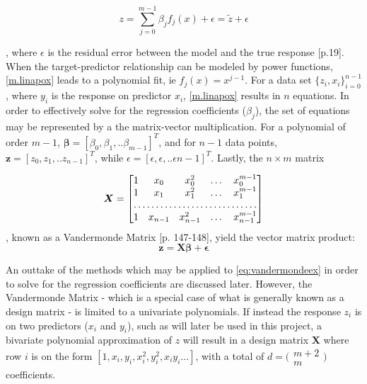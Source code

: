 \documentclass[%
oneside,                 %
final,                   %
10pt]{article}
\begin{document}
\begin{equation}
\displaystyle z=\sum_{j=0}^{m-1} \beta_j f_j(x)+\epsilon = \tilde{z}+\epsilon  
\label{m.linapox}
\end{equation}

, where $\epsilon$ is the residual error between the model and the true response \cite{MurphyKevin}[p.19]. When the target-predictor relationship can be modeled by power functions, \eqref{m.linapox} leads to a polynomial fit, ie $f_j(x)=x^{j-1}$. For a data set $\{z_i,x_i\} _{i=0}^{n-1}$, where $y_i$ is the response on predictor $x_i$, \eqref{m.linapox} results in $n$ equations. In order to effectively solve for the regression coefficients ($\beta_j$), the set of equations may be represented by a the matrix-vector multiplication. For a polynomial of order $m-1$, $\bm{\beta}=[\beta_0,\beta_1,..\beta_{m-1}]^T$, and for $n-1$ data points,  $\bm{z}=[z_0,z_1,..z_{n-1}]^T$, while $ \epsilon= [\epsilon,\epsilon,..\epsilon{n-1}]^T$. Lastly, the $n \times m $ matrix

\begin{equation}
\bm{X}=\begin{bmatrix}
    1       & x_0 & x_0^2 & \dots & x_0^{m-1} \\
    1       & x_1 & x_1^2 & \dots & x_1^{m-1} \\
    \hdotsfor{5} \\
    1       & x_{n-1} & x_{n-1}^2 & \dots & x_{n-1}^{m-1}
\end{bmatrix}
\end{equation}
, known as a Vandermonde Matrix \citep{Ascher}[p. 147-148], yield the vector matrix product:
\begin{equation}
\bm{z}=\bm{X}\bm{\beta}+\bm{\epsilon}
\label{eq:vandermondeex}
\end{equation}

An outtake of the methods which may be applied to \eqref{eq:vandermondeex} in order to solve for the regression coefficients are discussed later. However, the Vandermonde Matrix - which is a special case of what is generally known as a design matrix - is limited to a univariate polynomials. If instead the response $z_i$ is on two predictors ($x_i$ and $y_i$), such as will later be used in this project, a bivariate polynomial approximation of $z$  will result in a design matrix $\bm{X}$ where row $i$ is on the form $ [1,      x_i , y_i , x_i^2 , y_i^2 ,x_iy_i... ]$, with a total of $d=\bigl(\begin{smallmatrix}
  m+2 \\
  m
\end{smallmatrix}\bigr)$ coefficients.  
\end{document}
